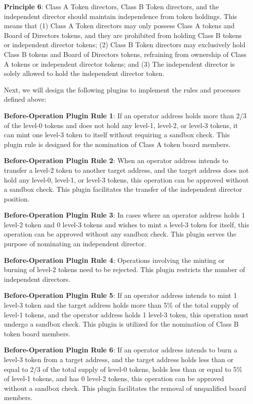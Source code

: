 \documentclass[main.tex]{subfiles}
\begin{document}
\textbf{Principle 6}: Class A Token directors, Class B Token directors, and the independent director should maintain independence from token holdings. This means that (1) Class A Token directors may only possess Class A tokens and Board of Directors tokens, and they are prohibited from holding Class B tokens or independent director tokens; (2) Class B Token directors may exclusively hold Class B tokens and Board of Directors tokens, refraining from ownership of Class A tokens or independent director tokens; and (3) The independent director is solely allowed to hold the independent director token.

Next, we will design the following plugins to implement the rules and processes defined above:

\textbf{Before-Operation Plugin Rule 1}: If an operator address holds more than 2/3 of the level-0 tokens and does not hold any level-1, level-2, or level-3 tokens, it can mint one level-3 token to itself without requiring a sandbox check. This plugin rule is designed for the nomination of Class A token board members.

\textbf{Before-Operation Plugin Rule 2}: When an operator address intends to transfer a level-2 token to another target address, and the target address does not hold any level-0, level-1, or level-3 tokens, this operation can be approved without a sandbox check. This plugin facilitates the transfer of the independent director position.

\textbf{Before-Operation Plugin Rule 3}: In cases where an operator address holds 1 level-2 token and 0 level-3 tokens and wishes to mint a level-3 token for itself, this operation can be approved without any sandbox check. This plugin serves the purpose of nominating an independent director.

\textbf{Before-Operation Plugin Rule 4}: Operations involving the minting or burning of level-2 tokens need to be rejected. This plugin restricts the number of independent directors.

\textbf{Before-Operation Plugin Rule 5}: If an operator address intends to mint 1 level-3 token and the target address holds more than 5\% of the total supply of level-1 tokens, and the operator address holds 1 level-3 token, this operation must undergo a sandbox check. This plugin is utilized for the nomination of Class B token board members.

\textbf{Before-Operation Plugin Rule 6}: If an operator address intends to burn a level-3 token from a target address, and the target address holds less than or equal to 2/3 of the total supply of level-0 tokens, holds less than or equal to 5\% of level-1 tokens, and has 0 level-2 tokens, this operation can be approved without a sandbox check. This plugin facilitates the removal of unqualified board members.
\end{document}
